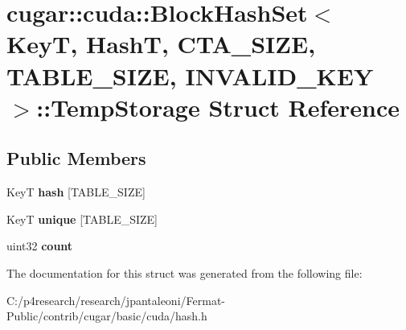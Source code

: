 \hypertarget{structcugar_1_1cuda_1_1_block_hash_set_1_1_temp_storage}{}\section{cugar\+:\+:cuda\+:\+:Block\+Hash\+Set$<$ KeyT, HashT, C\+T\+A\+\_\+\+S\+I\+ZE, T\+A\+B\+L\+E\+\_\+\+S\+I\+ZE, I\+N\+V\+A\+L\+I\+D\+\_\+\+K\+EY $>$\+:\+:Temp\+Storage Struct Reference}
\label{structcugar_1_1cuda_1_1_block_hash_set_1_1_temp_storage}
\subsection*{Public Members}
\begin{DoxyCompactItemize}
\item 
\mbox{\label{structcugar_1_1cuda_1_1_block_hash_set_1_1_temp_storage_a1b969c12b1611e8724ec78ca5ae77555}} 
KeyT {\bfseries hash} \mbox{[}T\+A\+B\+L\+E\+\_\+\+S\+I\+ZE\mbox{]}
\item 
\mbox{\label{structcugar_1_1cuda_1_1_block_hash_set_1_1_temp_storage_a1862fa5505d02b197ef2f56940156a59}} 
KeyT {\bfseries unique} \mbox{[}T\+A\+B\+L\+E\+\_\+\+S\+I\+ZE\mbox{]}
\item 
\mbox{\label{structcugar_1_1cuda_1_1_block_hash_set_1_1_temp_storage_a3b492c96f917720ab341545cdcc31270}} 
uint32 {\bfseries count}
\end{DoxyCompactItemize}


The documentation for this struct was generated from the following file\+:\begin{DoxyCompactItemize}
\item 
C\+:/p4research/research/jpantaleoni/\+Fermat-\/\+Public/contrib/cugar/basic/cuda/hash.\+h\end{DoxyCompactItemize}
